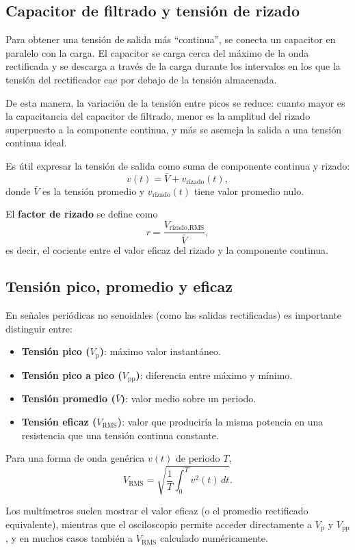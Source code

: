 \documentclass[a4paper,12pt]{article}
\begin{document}
\subsection{Capacitor de filtrado y tensión de rizado}

Para obtener una tensión de salida más “continua”, se conecta un capacitor en paralelo con la carga. El capacitor se carga cerca del máximo de la onda rectificada y se descarga a través de la carga durante los intervalos en los que la tensión del rectificador cae por debajo de la tensión almacenada.

De esta manera, la variación de la tensión entre picos se reduce: cuanto mayor es la capacitancia del capacitor de filtrado, menor es la amplitud del rizado superpuesto a la componente continua, y más se asemeja la salida a una tensión continua ideal.

Es útil expresar la tensión de salida como suma de componente continua y rizado:
\[
v(t) = \bar{V} + v_{\text{rizado}}(t),
\]
donde \(\bar{V}\) es la tensión promedio y \(v_{\text{rizado}}(t)\) tiene valor promedio nulo.

El \textbf{factor de rizado} se define como
\[
r = \frac{V_{\text{rizado,RMS}}}{\bar{V}},
\]
es decir, el cociente entre el valor eficaz del rizado y la componente continua.

\subsection{Tensión pico, promedio y eficaz}

En señales periódicas no senoidales (como las salidas rectificadas) es importante distinguir entre:
\begin{itemize}
    \item \textbf{Tensión pico (\(V_{\text{p}}\))}: máximo valor instantáneo.
    \item \textbf{Tensión pico a pico (\(V_{\text{pp}}\))}: diferencia entre máximo y mínimo.
    \item \textbf{Tensión promedio (\(\bar{V}\))}: valor medio sobre un periodo.
    \item \textbf{Tensión eficaz (\(V_{\text{RMS}}\))}: valor que produciría la misma potencia en una resistencia que una tensión continua constante.
\end{itemize}

Para una forma de onda genérica \(v(t)\) de periodo \(T\),
\[
V_{\text{RMS}} = \sqrt{\frac{1}{T}\int_0^{T} v^2(t)\, dt}.
\]

Los multímetros suelen mostrar el valor eficaz (o el promedio rectificado equivalente), mientras que el osciloscopio permite acceder directamente a \(V_{\text{p}}\) y \(V_{\text{pp}}\), y en muchos casos también a \(V_{\text{RMS}}\) calculado numéricamente.
\end{document}
